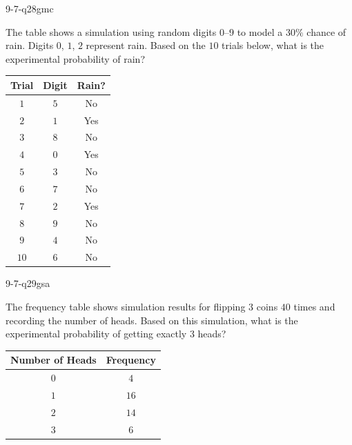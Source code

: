 \begin{practiceQuestion}{9-7-q28}{gmc}
\begin{questionText}
The table shows a simulation using random digits $0$--$9$ to model a $30\%$ chance of rain. Digits $0$, $1$, $2$ represent rain. Based on the $10$ trials below, what is the experimental probability of rain?

\begin{center}
\begin{tabular}{|c|c|c|}
\hline
\textbf{Trial} & \textbf{Digit} & \textbf{Rain?} \\
\hline
$1$ & $5$ & No \\
\hline
$2$ & $1$ & Yes \\
\hline
$3$ & $8$ & No \\
\hline
$4$ & $0$ & Yes \\
\hline
$5$ & $3$ & No \\
\hline
$6$ & $7$ & No \\
\hline
$7$ & $2$ & Yes \\
\hline
$8$ & $9$ & No \\
\hline
$9$ & $4$ & No \\
\hline
$10$ & $6$ & No \\
\hline
\end{tabular}
\end{center}
\end{questionText}
\end{practiceQuestion}

\begin{practiceQuestion}{9-7-q29}{gsa}
\begin{questionText}
The frequency table shows simulation results for flipping $3$ coins $40$ times and recording the number of heads. Based on this simulation, what is the experimental probability of getting exactly $3$ heads?

\begin{center}
\begin{tabular}{|c|c|}
\hline
\textbf{Number of Heads} & \textbf{Frequency} \\
\hline
$0$ & $4$ \\
\hline
$1$ & $16$ \\
\hline
$2$ & $14$ \\
\hline
$3$ & $6$ \\
\hline
\end{tabular}
\end{center}
\end{questionText}
\end{practiceQuestion}

